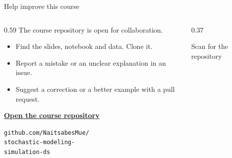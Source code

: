 \documentclass{beamer}
\begin{document}
\begin{frame}{Help improve this course}
  \begin{columns}[c,onlytextwidth]
    \begin{column}{0.59\textwidth}
      \large The course repository is open for collaboration.\normalsize
      \vspace{0.6em}
      \begin{itemize}
        \item Find the slides, notebook and data. Clone it.
        \item Report a mistake or an unclear explanation in an issue.
        \item Suggest a correction or a better example with a pull request.
      \end{itemize}
      \vspace{0.5em}
      \href{https://github.com/NaitsabesMue/stochastic-modeling-simulation-ds}{\textbf{Open the course repository}}
      \par\vspace{0.2em}
      {\scriptsize\texttt{github.com/NaitsabesMue/}\\
      \texttt{stochastic-modeling-}\\
      \texttt{simulation-ds}}
    \end{column}
    \begin{column}{0.37\textwidth}
      \centering
      \par\small Scan for the repository
    \end{column}
  \end{columns}
\end{frame}
\end{document}
